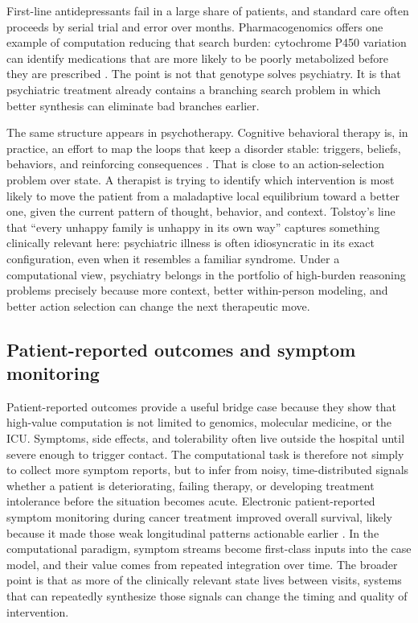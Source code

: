 \documentclass[11pt]{article}
\begin{document}
First-line antidepressants fail in a large share of patients, and standard care often proceeds by serial trial and error over months. Pharmacogenomics offers one example of computation reducing that search burden: cytochrome P450 variation can identify medications that are more likely to be poorly metabolized before they are prescribed \citep{hicks2015}. The point is not that genotype solves psychiatry. It is that psychiatric treatment already contains a branching search problem in which better synthesis can eliminate bad branches earlier.

The same structure appears in psychotherapy. Cognitive behavioral therapy is, in practice, an effort to map the loops that keep a disorder stable: triggers, beliefs, behaviors, and reinforcing consequences \citep{beck2005}. That is close to an action-selection problem over state. A therapist is trying to identify which intervention is most likely to move the patient from a maladaptive local equilibrium toward a better one, given the current pattern of thought, behavior, and context. Tolstoy's line that ``every unhappy family is unhappy in its own way'' captures something clinically relevant here: psychiatric illness is often idiosyncratic in its exact configuration, even when it resembles a familiar syndrome. Under a computational view, psychiatry belongs in the portfolio of high-burden reasoning problems precisely because more context, better within-person modeling, and better action selection can change the next therapeutic move.

\subsection{Patient-reported outcomes and symptom monitoring}
Patient-reported outcomes provide a useful bridge case because they show that high-value computation is not limited to genomics, molecular medicine, or the ICU. Symptoms, side effects, and tolerability often live outside the hospital until severe enough to trigger contact. The computational task is therefore not simply to collect more symptom reports, but to infer from noisy, time-distributed signals whether a patient is deteriorating, failing therapy, or developing treatment intolerance before the situation becomes acute. Electronic patient-reported symptom monitoring during cancer treatment improved overall survival, likely because it made those weak longitudinal patterns actionable earlier \citep{basch2016,basch2017}. In the computational paradigm, symptom streams become first-class inputs into the case model, and their value comes from repeated integration over time. The broader point is that as more of the clinically relevant state lives between visits, systems that can repeatedly synthesize those signals can change the timing and quality of intervention.
\end{document}
